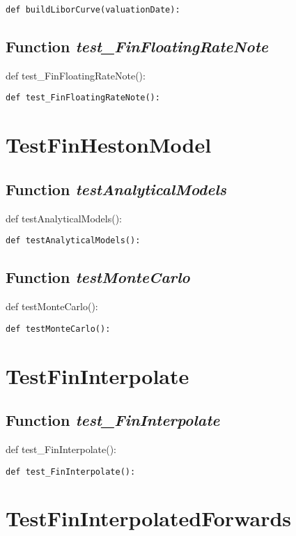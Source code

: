 \documentclass[twoside,11pt]{book}
\begin{document}
\begin{lstlisting}
def buildLiborCurve(valuationDate):
\end{lstlisting}

\subsection{Function {\it test\_FinFloatingRateNote}}
def test\_FinFloatingRateNote():

\begin{lstlisting}
def test_FinFloatingRateNote():
\end{lstlisting}


\newpage
\section{TestFinHestonModel}

\subsection{Function {\it testAnalyticalModels}}
def testAnalyticalModels():

\begin{lstlisting}
def testAnalyticalModels():
\end{lstlisting}

\subsection{Function {\it testMonteCarlo}}
def testMonteCarlo():

\begin{lstlisting}
def testMonteCarlo():
\end{lstlisting}


\newpage
\section{TestFinInterpolate}

\subsection{Function {\it test\_FinInterpolate}}
def test\_FinInterpolate():

\begin{lstlisting}
def test_FinInterpolate():
\end{lstlisting}


\newpage
\section{TestFinInterpolatedForwards}
\end{document}
